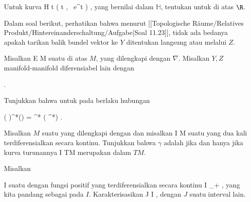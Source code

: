 {}
{

Untuk kurva
\maabbeledisp {\psi} {\R} { {\mathbb H}
} { t } { \left(  t   , \,  e^t                   \right)
} {,}
yang bernilai dalam
${\mathbb H}$, tentukan
untuk
 {} {}
di atas $\R$.

}
{} {}

Dalam soal berikut, perhatikan bahwa menurut
[[Topologische Räume/Relatives Produkt/Hintereinanderschaltung/Aufgabe|Soal 11.23]],
tidak ada bedanya apakah tarikan balik bundel vektor ke $Y$ ditentukan langsung atau melalui $Z$.

{}
{

Misalkan
 { E } { M
} {}
suatu
di atas
$M$, yang dilengkapi dengan
$\nabla$. Misalkan $Y,Z$ manifold-manifold diferensiabel lain dengan

 { . }

Tunjukkan bahwa untuk
pada
 berlaku hubungan

\mavergleichskettedisp
{\vergleichskette
{ \left(  \psi \circ \varphi  \right)^*(\nabla)
}
{ =} { \varphi^*  \left(  \psi^*\nabla  \right)
}
{ } {
}
{ } {
}
{ } {
}
}
{}{}{.}

}
{} {}

{}
{

Misalkan $M$ suatu
yang dilengkapi dengan
dan misalkan
\maabbdisp {\gamma} { I } { M
} {}
suatu
yang dua kali terdiferensialkan secara kontinu. Tunjukkan bahwa $\gamma$ adalah
jika dan hanya jika kurva turunannya
 { I } { TM
} {}
merupakan
dalam
$TM$.

}
{} {}

{}
{

Misalkan

\mavergleichskette
{\vergleichskette
{ I
}
{ \subseteq }{ \R
}
{  }{
}
{    }{
}
{   }{
}
}
{}{}{}
suatu
dengan fungsi positif yang terdiferensialkan secara kontinu
 { I } { \R_+
} {,}
yang kita pandang sebagai
pada $I$. Karakterisasikan
\maabbdisp {\gamma} { J } { I
} {,}
dengan $J$ suatu interval lain.

}
{} {}

